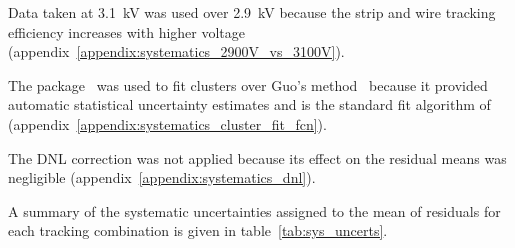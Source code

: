 Data taken at 3.1~kV was used over 2.9~kV because the strip and wire tracking efficiency increases with higher voltage~\cite{lefebvre_thesis} (appendix~\ref{appendix:systematics_2900V_vs_3100V}).

The  package~\cite{hatlo_developments_2005} was used to fit clusters over Guo's method~\cite{guo_simple_2011} because it provided automatic statistical uncertainty estimates and is the standard fit algorithm of ~\cite{ROOT_paper} (appendix~\ref{appendix:systematics_cluster_fit_fcn}).

The DNL correction was not applied because its effect on the residual means was negligible (appendix~\ref{appendix:systematics_dnl}).

A summary of the systematic uncertainties assigned to the mean of residuals for each tracking combination is given in table~\ref{tab:sys_uncerts}.

